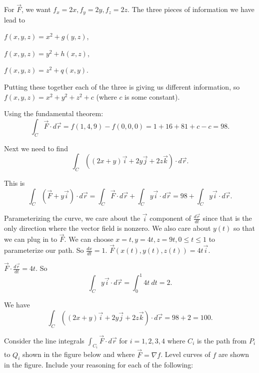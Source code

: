 \documentclass[12pt,letterpaper,noanswers]{exam}
\begin{document}
\begin{questions}
\begin{parts}
\begin{solution}
For $\vec F$, we want $f_x = 2x, f_y = 2y, f_z = 2z$.  The three pieces of information we have lead to

$f(x,y,z) = x^2 + g(y,z)$,

$f(x,y,z) = y^2 + h(x,z)$,

$f(x,y,z) = z^2 + q(x,y)$.

Putting these together each of the three is giving us different information, so $f(x,y,z) = x^2+y^2+z^2 +c$ (where $c$ is some constant).

Using the fundamental theorem:
\[\int_C \vec F\cdot d\vec r = f(1,4,9)-f(0,0,0) = 1+16+81+c-c = 98.\]

Next we need to find
\[\int_C ((2x+y)\vec i + 2y\vec j + 2z\vec k)\cdot d\vec r.\]

This is \[\int_C (\vec F+y\vec i)\cdot d\vec r  =\int_C \vec F\cdot d\vec r + \int_C y\vec i \cdot d\vec r = 98+\int_C y\vec i\cdot d\vec r.\]

Parameterizing the curve, we care about the $\vec i$ component of $\frac{d\vec r}{dt}$ since that is the only direction where the vector field is nonzero.  We also care about $y(t)$ so that we can plug in to $\vec F$.  We can choose $x = t, y = 4t, z = 9t, 0\leq t\leq 1$ to parameterize our path.  So $\frac{dx}{dt} = 1$.  $\vec F(x(t),y(t),z(t)) = 4t\vec i$.

$\vec F \cdot \frac{d\vec r}{dt} = 4t$.  So \[\int_C y\vec i\cdot d\vec r = \int_0^1 4t\ dt = 2.\]

We have \[\int_C ((2x+y)\vec i + 2y\vec j + 2z\vec k)\cdot d\vec r = 98+2 = 100.\]
\end{solution}

\end{parts}

\question Consider the line integrals $\int_{C_i} \vec F\cdot d\vec r$ for $i = 1,2,3,4$ where $C_i$ is the path from $P_i$ to $Q_i$ shown in the figure below and where $\vec F = \nabla f$.  Level curves of $f$ are shown in the figure.  Include your reasoning for each of the following:


\end{questions}
\end{document}
